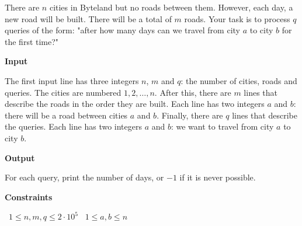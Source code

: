 There are $n$ cities in Byteland but no roads between them. However, each day, a new road will be built. There will be a total of $m$ roads.
Your task is to process $q$ queries of the form: "after how many days can we travel from city $a$ to city $b$ for the first time?"

\vspace{0.3cm}\noindent\textbf{Input}

The first input line has three integers $n$, $m$ and $q$: the number of cities, roads and queries. The cities are numbered $1,2,\dots,n$.
After this, there are $m$ lines that describe the roads in the order they are built. Each line has two integers $a$ and $b$: there will be a road between cities $a$ and $b$.
Finally, there are $q$ lines that describe the queries. Each line has two integers $a$ and $b$: we want to travel from city $a$ to city $b$.

\vspace{0.3cm}\noindent\textbf{Output}

For each query, print the number of days, or $-1$ if it is never possible.

\vspace{0.3cm}\noindent\textbf{Constraints}

\textbullet\ $1 \le n, m, q \le 2 \cdot 10^5$
\textbullet\ $1 \le a,b \le n$